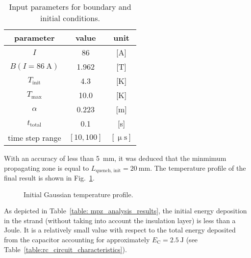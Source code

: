 \begin{table}[H]
    \caption{Input parameters for boundary and initial conditions.} 
    \vspace{-1.em} 
    \fontsize{10}{10}
    \selectfont 
    \renewcommand{\arraystretch}{1.5}
    \begin{center}
        \begin{tabular}{ ccc }  
        \hline
        parameter & value & unit \\
        \hline
        $I$ & 86 & [A] \\
        $B(I=86~\text{A})$ & 1.962 & [T] \\
        $T_\text{init}$ & 4.3 & [K] \\
        $T_\text{max}$ & 10.0 & [K] \\
        $\alpha$ & 0.223 & [m] \\   
        $t_\text{total}$ & 0.1 & [s] \\
        time step range & $[10, 100]$ & $[\upmu \text{s}]$ \\
        \hline 
        \end{tabular}
    \end{center}  
     \label{table: mpz_analysis_input_parameters} 
 \end{table}
 
With an accuracy of less than 5~mm, it was deduced that the minmimum propagating zone is equal to $L_\text{quench, init}=20~\text{mm}$. The temperature profile of the final result is shown in Fig.~\ref{fig: init_gauss_temp_distr_mpz}. 
 
\begin{figure}[H]
    \centering
    \caption{Initial Gaussian temperature profile.}
    \label{fig: init_gauss_temp_distr_mpz}
\end{figure}

As depicted in Table~\ref{table: mpz_analysis_results}, the initial energy deposition in the strand (without taking into account the insulation layer) is less than a Joule. It is a relatively small value with respect to the total energy deposited from the capacitor accounting for approximately $E_\text{C}=2.5~\text{J}$ (see Table~\ref{table:rc_circuit_characteristics}).

